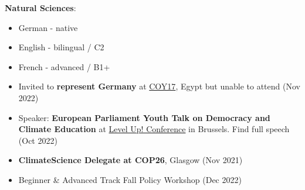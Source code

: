 \documentclass[10pt,a4paper,ragged2e,withhyper]{altacv}
\begin{document}
\begin{paracol}{2}
\textbf{Natural Sciences}:\\
\vspace{3mm}


\begin{itemize}
    \item German - native
    \item English - bilingual / C2
    \item French - advanced / B1+
\end{itemize}

\begin{itemize}
    \item Invited to \textbf{represent Germany} at \href{https://coy17eg.com/}{COY17}, Egypt but unable to attend (Nov 2022)
    \item Speaker: \textbf{European Parliament Youth Talk on Democracy and Climate Education} at \href{https://www.levelup22.eu}{Level Up! Conference} in Brussels. Find full speech  (Oct 2022)
    \item \textbf{ClimateScience Delegate at COP26}, Glasgow (Nov 2021)
\end{itemize}

\begin{itemize}
    \item Beginner \& Advanced Track  Fall Policy Workshop (Dec 2022)
\end{itemize}

\newpage





\end{paracol}
\end{document}
